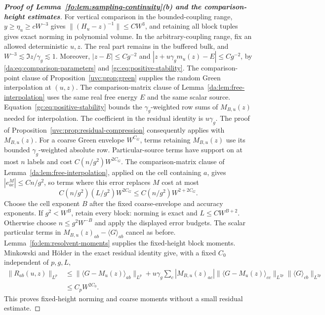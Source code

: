 \documentclass[11pt]{article}
\numberwithin{equation}{section}
\theoremstyle{remark}
\begin{document}
\begin{proof}[\textbf{Proof of Lemma~\ref{fo:lem:sampling-continuity}(b) and the comparison-height estimates}]
For vertical comparison in the bounded-coupling range,
$y\ge\eta_u\ge cW^{-3}$ gives $\|(H_u-z)^{-1}\|\le CW^3$,
and retaining all block tuples gives exact norming in polynomial volume.
In the arbitrary-coupling range, fix an allowed deterministic $u,z$.
The real part remains in the buffered bulk, and
$W^{-3}\lesssim\Im z/\gamma_g\lesssim1$. Moreover,
$|z-E|\le Cg^{-2}$ and
$|z+u\gamma_gm_u(z)-E|\le Cg^{-2}$, by
\eqref{da:eq:comparison-parameters} and \eqref{gc:eq:positive-stability}.
The comparison-point clause of Proposition~\ref{uvc:prop:green} supplies
the random Green interpolation at $(u,z)$. The comparison-matrix clause
of Lemma~\ref{da:lem:free-interpolation} uses the same real free energy
$E$ and the same scalar source. Equation~\eqref{gc:eq:positive-stability}
bounds the $\gamma_g$-weighted row sums of $M_{B,u}(z)$ needed for
interpolation. The coefficient in the residual identity is $u\gamma_g$.
The proof of Proposition~\ref{uvc:prop:residual-compression} consequently
applies with $M_{B,u}(z)$. For a coarse Green envelope $W^{C_G}$,
terms retaining $M_{B,u}(z)$ use its bounded $\gamma_g$-weighted
absolute row. Particular-source terms have support on at most $n$
labels and cost $C(n/g^2)W^{2C_G}$. The comparison-matrix clause of
Lemma~\ref{da:lem:free-interpolation}, applied on the cell containing $a$,
gives $|e^M_{ac}|\le Cn/g^2$,
so terms where this error replaces $M$ cost at most
\[
 C(n/g^2)(L/g^2)W^{2C_G}\le C(n/g^2)W^{2+2C_G}.
\]
Choose the cell exponent $B$ after the fixed coarse-envelope and
accuracy exponents. If $g^2<W^B$, retain every block: norming is
exact and $L\le CW^{B+2}$. Otherwise choose $n\le g^2W^{-B}$ and
apply the displayed error budgets. The scalar particular terms in
$M_{B,u}(z)_{ab}-\langle G\rangle_{ab}$ cancel as before.
Lemma~\ref{fo:lem:resolvent-moments} supplies the fixed-height block
moments. Minkowski and H\"older in the exact residual identity give,
with a fixed $C_0$ independent of $p,g,L$,
\[
 \begin{aligned}
 \|R_{ab}(u,z)\|_{L^p}
 &\le\|\langle G-M_u(z)\rangle_{ab}\|_{L^p}
  +u\gamma_g\sum_c|M_{B,u}(z)_{ac}|
   \|\langle G-M_u(z)\rangle_{cc}\|_{L^{2p}}
   \|\langle G\rangle_{cb}\|_{L^{2p}}\\
 &\le C_pW^{2C_0}.
 \end{aligned}
\]
This proves fixed-height norming and coarse moments without a small
residual estimate.


\end{proof}
\end{document}
